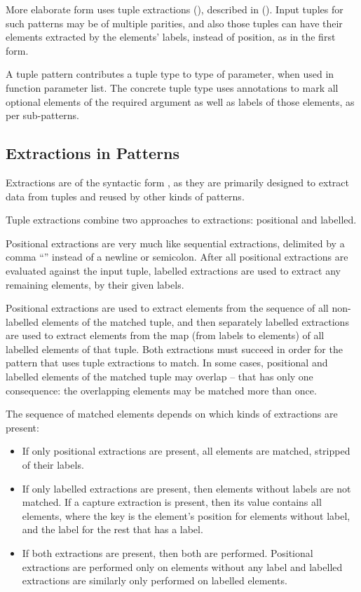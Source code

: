 More elaborate form uses tuple extractions (), described in (). Input tuples for such patterns may be of multiple parities, and also those tuples can have their elements extracted by the elements' labels, instead of position, as in the first form. 

A tuple pattern contributes a tuple type to type of parameter, when used in function parameter list. The concrete tuple type uses annotations to mark all optional elements of the required argument as well as labels of those elements, as per sub-patterns. 





\subsection{Extractions in Patterns}
\label{sec:extractions-in-patterns}

Extractions are of the syntactic form , as they are primarily designed to extract data from tuples and reused by other kinds of patterns. 

Tuple extractions combine two approaches to extractions: positional and labelled. 

Positional extractions are very much like sequential extractions, delimited by a comma ``\code{,}'' instead of a newline or semicolon. After all positional extractions are evaluated against the input tuple, labelled extractions are used to extract any remaining elements, by their given labels. 

Positional extractions are used to extract elements from the sequence of all non-labelled elements of the matched tuple, and then separately labelled extractions are used to extract elements from the map (from labels to elements) of all labelled elements of that tuple. Both extractions must succeed in order for the pattern that uses tuple extractions to match. In some cases, positional and labelled elements of the matched tuple may overlap -- that has only one consequence: the overlapping elements may be matched more than once. 

The sequence of matched elements depends on which kinds of extractions are present:
\begin{itemize}
  \item If only positional extractions are present, all elements are matched, stripped of their labels. 
  \item If only labelled extractions are present, then elements without labels are not matched. If a capture extraction is present, then its value contains all elements, where the key is the element's position for elements without label, and the label for the rest that has a label. 
  \item If both extractions are present, then both are performed. Positional extractions are performed only on elements without any label and labelled extractions are similarly only performed on labelled elements. 
\end{itemize}





